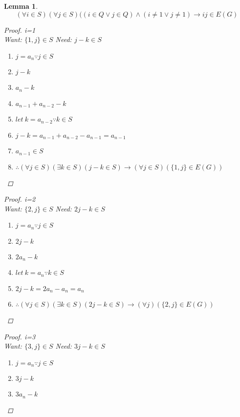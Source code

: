 \documentclass{article}
\newtheorem{lemma}[theorem]{Lemma}
\begin{document}
\begin{lemma}
  \[(\forall i \in S)(\forall j \in S)((i\in Q \vee j\in Q) \wedge (i \neq 1 \vee j \neq 1) \rightarrow ij \in E(G)\]
  \begin{proof}i=1\\
    Want: ${\{1,j\} \in S}$\newline
    Need: ${j-k \in S}$
    \begin{enumerate}
        \item ${j = a_{n}}\because j \in S$
        \item ${j-k}$
        \item ${a_{n}-k}$
        \item ${a_{n-1}+a_{n-2}-k}$
        \item ${let\ k=a_{n-2}}\because k \in S$
        \item ${j-k=a_{n-1}+a_{n-2}-a_{n-1}=a_{n-1}}$
        \item ${a_{n-1}\in S}$
        \item $\therefore {(\forall j \in S)(\exists k \in S)(j-k \in S) \rightarrow (\forall j \in S) (\{1,j\} \in E(G))}$
    \end{enumerate}
  \end{proof}
  \begin{proof}i=2\\
    Want: ${\{2,j\} \in S}$\newline
    Need: ${2j-k \in S}$
    \begin{enumerate}
        \item ${j=a_{n}}\because j \in S$
        \item ${2j-k}$
        \item ${2a_{n}-k}$
        \item ${let\  k=a_{n}}\because k \in S$
        \item ${2j-k=2a_{n}-a_{n}=a_{n}}$
        \item $\therefore{(\forall j \in S)(\exists k \in S)(2j-k \in S)\rightarrow(\forall j)(\{2,j\}\in E(G))}$
    \end{enumerate}
  \end{proof}
  \begin{proof} i=3\\
    Want: ${\{3,j\} \in S}$\newline
    Need: ${3j-k \in S}$
    \begin{enumerate}
        \item ${j=a_{n}}\because j\in S$
        \item ${3j-k}$
        \item ${3a_{n}-k}$

\end{enumerate}
\end{proof}
\end{lemma}
\end{document}
